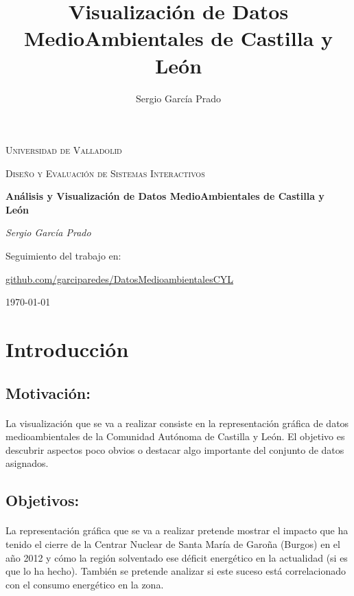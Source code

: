 \documentclass{article}
\title{Visualización de Datos MedioAmbientales de Castilla y León}
\author{Sergio García Prado}
\begin{document}
	\begin{titlepage}
		\centering
		{\scshape\LARGE Universidad de Valladolid \par}
		\vspace{1cm}
		{\scshape\Large Diseño y Evaluación de Sistemas Interactivos\par}
		\vspace{1.5cm}
		{\huge\bfseries Análisis y Visualización de Datos MedioAmbientales de Castilla y León\par}
		\vspace{2cm}
		{\Large\itshape Sergio García Prado\par}
	
		\vfill
		Seguimiento del trabajo en: \par
		\href{https://github.com/garciparedes/DatosMedioambientalesCYL}{github.com/garciparedes/DatosMedioambientalesCYL}
		\vfill


		{\large \today\par}
	\end{titlepage}



	\newpage
		\tableofcontents
	\newpage


	\section{Introducción}

		\subsection{Motivación:}

			\paragraph{}
			La visualización que se va a realizar consiste en la representación gráfica de datos medioambientales de la Comunidad Autónoma de Castilla y León. El objetivo es descubrir aspectos poco obvios o destacar algo importante del conjunto de datos asignados.
					
		\subsection{Objetivos:}
		
			\paragraph{}
			La representación gráfica que se va a realizar pretende mostrar el impacto que ha tenido el cierre de la Centrar Nuclear de Santa María de Garoña (Burgos) en el año 2012 y cómo la región solventado ese déficit energético en la actualidad (si es que lo ha hecho). También se pretende analizar si este suceso está correlacionado con el consumo energético en la zona.
		
\end{document}

